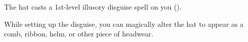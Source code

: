





The hat casts a 1st-level illusory disguise spell on you ().

While setting up the disguise, you can magically alter the hat to appear as a comb, ribbon, helm, or other piece of headwear.

\vfill

\ItemBulk{-}
